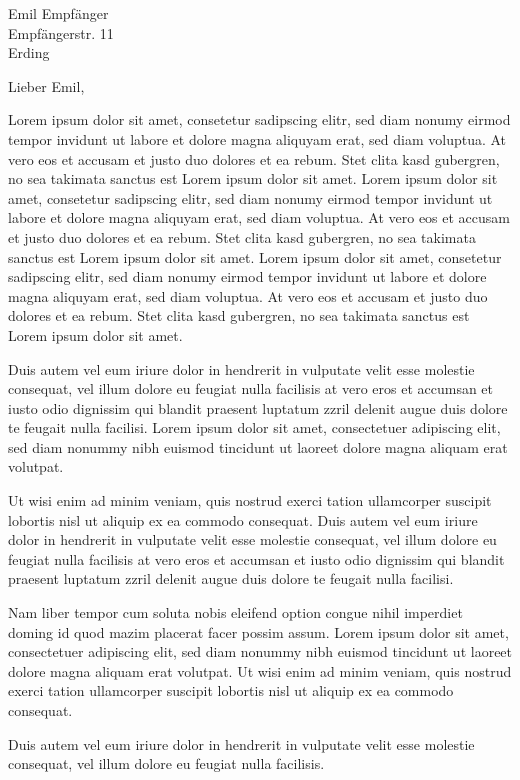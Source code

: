 \documentclass{scrlttr2}
\begin{document}
\begin{letter}{Emil Empfänger\\Empfängerstr. 11\\Erding}
  \opening{Lieber Emil,}

  Lorem ipsum dolor sit amet, consetetur sadipscing elitr, sed diam nonumy
  eirmod tempor invidunt ut labore et dolore magna aliquyam erat, sed diam
  voluptua. At vero eos et accusam et justo duo dolores et ea rebum. Stet clita
  kasd gubergren, no sea takimata sanctus est Lorem ipsum dolor sit amet. Lorem
  ipsum dolor sit amet, consetetur sadipscing elitr, sed diam nonumy eirmod
  tempor invidunt ut labore et dolore magna aliquyam erat, sed diam voluptua. At
  vero eos et accusam et justo duo dolores et ea rebum. Stet clita kasd
  gubergren, no sea takimata sanctus est Lorem ipsum dolor sit amet. Lorem ipsum
  dolor sit amet, consetetur sadipscing elitr, sed diam nonumy eirmod tempor
  invidunt ut labore et dolore magna aliquyam erat, sed diam voluptua. At vero
  eos et accusam et justo duo dolores et ea rebum. Stet clita kasd gubergren, no
  sea takimata sanctus est Lorem ipsum dolor sit amet.

  Duis autem vel eum iriure dolor in hendrerit in vulputate velit esse molestie
  consequat, vel illum dolore eu feugiat nulla facilisis at vero eros et
  accumsan et iusto odio dignissim qui blandit praesent luptatum zzril delenit
  augue duis dolore te feugait nulla facilisi. Lorem ipsum dolor sit amet,
  consectetuer adipiscing elit, sed diam nonummy nibh euismod tincidunt ut
  laoreet dolore magna aliquam erat volutpat.

  Ut wisi enim ad minim veniam, quis nostrud exerci tation ullamcorper suscipit
  lobortis nisl ut aliquip ex ea commodo consequat. Duis autem vel eum iriure
  dolor in hendrerit in vulputate velit esse molestie consequat, vel illum
  dolore eu feugiat nulla facilisis at vero eros et accumsan et iusto odio
  dignissim qui blandit praesent luptatum zzril delenit augue duis dolore te
  feugait nulla facilisi.

  Nam liber tempor cum soluta nobis eleifend option congue nihil imperdiet
  doming id quod mazim placerat facer possim assum. Lorem ipsum dolor sit amet,
  consectetuer adipiscing elit, sed diam nonummy nibh euismod tincidunt ut
  laoreet dolore magna aliquam erat volutpat. Ut wisi enim ad minim veniam, quis
  nostrud exerci tation ullamcorper suscipit lobortis nisl ut aliquip ex ea
  commodo consequat.

  Duis autem vel eum iriure dolor in hendrerit in vulputate velit esse molestie
  consequat, vel illum dolore eu feugiat nulla facilisis.


\end{letter}
\end{document}

